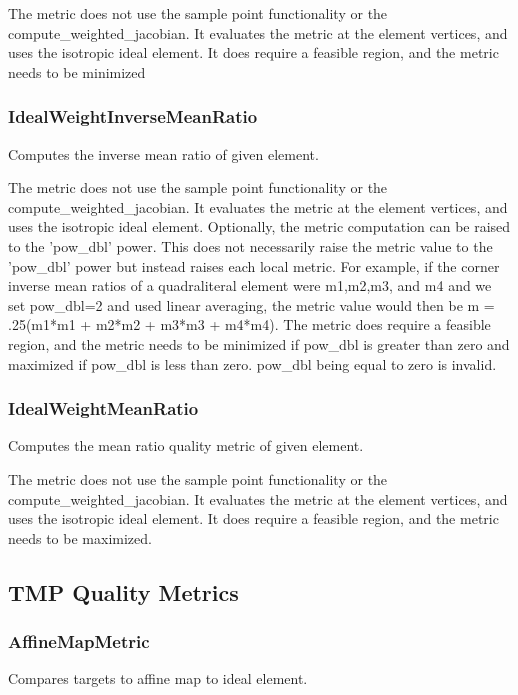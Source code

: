      The metric does not use the sample point functionality or the compute\_weighted\_jacobian.  It evaluates the metric at  the element vertices, and uses the isotropic ideal element. It does require a feasible region, and the metric needs to be minimized

\subsubsection{IdealWeightInverseMeanRatio}

Computes the inverse mean ratio of given element.

The metric does not use the sample point functionality or the compute\_weighted\_jacobian.  It evaluates the metric at the element vertices, and uses the isotropic ideal element.  Optionally, the metric computation can be raised to the 'pow\_dbl' power.  This does not necessarily raise the metric value to the 'pow\_dbl' power but instead raises each local metric.  For example, if the corner inverse mean ratios of a quadraliteral element were m1,m2,m3, and m4 and we set pow\_dbl=2 and used linear averaging, the metric value would then be m = .25(m1*m1 + m2*m2 + m3*m3 + m4*m4).  The metric does require a feasible region, and the metric needs to be minimized if pow\_dbl is greater than zero and maximized if pow\_dbl is less than zero.  pow\_dbl being equal to zero is invalid.

\subsubsection{IdealWeightMeanRatio}

Computes the mean ratio quality metric of given element.
     
 The metric does not use the sample point functionality or the     compute\_weighted\_jacobian.  It evaluates the metric at the element vertices, and uses the isotropic ideal element.  It does require a feasible region, and the metric needs to be maximized.

\subsection{TMP Quality Metrics}

\subsubsection{AffineMapMetric}

Compares targets to affine map to ideal element.

